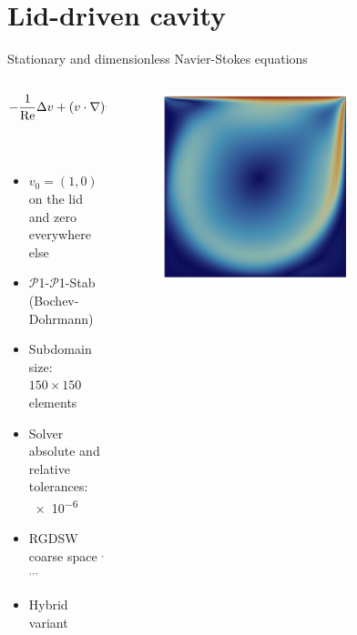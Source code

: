 \section{Lid-driven cavity}
\begin{frame}{Stationary and dimensionless Navier-Stokes equations}
	\vspace{-5mm}
	\begin{columns}
		\begin{column}{0.6\textwidth}%
			\begin{align*}
				-\frac{1}{\rm Re} \Delta v + (v \cdot \nabla)v + \nabla p & = 0 \;   & {\rm in}\; \Omega           \\
				{\rm div}(v)                                              & = 0 \;   & {\rm in} \; \Omega          \\
				v                                                         & = v_0 \; & {\rm on} \; \partial \Omega
			\end{align*}
			\vspace{-4mm}
			\begin{itemize}
				\item $v_0=(1,0)$ on the lid and zero everywhere else
				\item $\mathcal{P}$1-$\mathcal{P}$1-Stab (Bochev-Dohrmann) \footnotemark{}
				\item Subdomain size: $150\times 150$ elements
				\item Solver absolute and relative tolerances: \num{e-6}
				\item RGDSW coarse space \footnotemark[3]$^,$\footnotemark[4]$^,$\footnotemark[5]$^,$\footnotemark[6]$^,$\footnotemark[7]
				\item Hybrid variant
			\end{itemize}
		\end{column}
		\begin{column}{0.4\textwidth}
			\begin{figure}
				\centering
				\includegraphics[width=0.7\textwidth]{images/ldc.png}

\end{figure}
\end{column}
\end{columns}
\end{frame}
